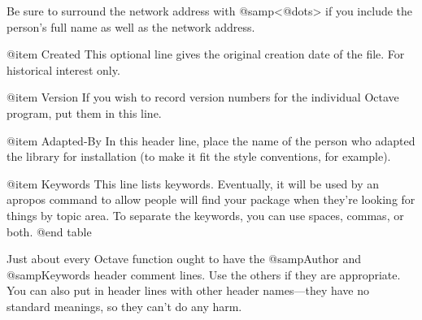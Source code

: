 Be sure to surround the network address with @samp{<@dots{}>} if
you include the person's full name as well as the network address.

@item Created
This optional line gives the original creation date of the
file.  For historical interest only.

@item Version
If you wish to record version numbers for the individual Octave program,
put them in this line.

@item Adapted-By
In this header line, place the name of the person who adapted the
library for installation (to make it fit the style conventions, for
example).

@item Keywords
This line lists keywords.  Eventually, it will be used by an apropos
command to allow people will find your package when they're looking for
things by topic area.  To separate the keywords, you can use spaces,
commas, or both.
@end table

Just about every Octave function ought to have the @samp{Author} and
@samp{Keywords} header comment lines.  Use the others if they are
appropriate.  You can also put in header lines with other header
names---they have no standard meanings, so they can't do any harm.
